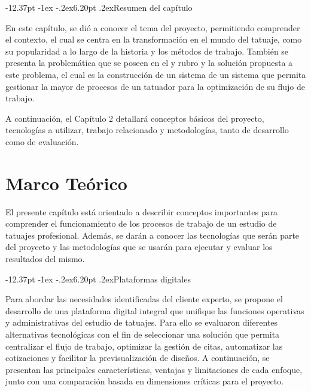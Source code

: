 \documentclass[12pt,letterpaper,oneside]{report}
\makeatletter
\renewcommand\section{\@startsection{section}{1}{\z@}%
  {-12.37pt \@plus -1ex \@minus -.2ex}{6.20pt \@plus.2ex}{\normalfont\large\bfseries}}
\makeatother
\begin{document}
\section{Resumen del capítulo}

En este capítulo, se dió a conocer el tema del proyecto, permitiendo comprender el contexto, el cual se centra en la transformación en el mundo del tatuaje, como su popularidad a lo largo de la historia y los métodos de trabajo. También se presenta la problemática que se poseen en el y rubro y la solución propuesta a este problema, el cual es la construcción de un sistema de un sistema que permita gestionar la mayor de procesos de un tatuador para la optimización de su flujo de trabajo.

A continuación, el Capítulo 2 detallará conceptos básicos del proyecto, tecnologías a utilizar, trabajo relacionado y metodologías, tanto de desarrollo como de evaluación.
\chapter{Marco Teórico}

El presente capítulo está orientado a describir conceptos importantes para comprender el funcionamiento de los procesos de trabajo de un estudio de tatuajes profesional. Además, se darán a conocer las tecnologías que serán parte del proyecto y las metodologías que se usarán para ejecutar y evaluar los resultados del mismo.

\section{Plataformas digitales}

Para abordar las necesidades identificadas del cliente experto, se propone el desarrollo de una plataforma digital integral que unifique las funciones operativas y administrativas del estudio de tatuajes. Para ello se evaluaron diferentes alternativas tecnológicas con el fin de seleccionar una solución que permita centralizar el flujo de trabajo, optimizar la gestión de citas, automatizar las cotizaciones y facilitar la previsualización de diseños. A continuación, se presentan las principales características, ventajas y limitaciones de cada enfoque, junto con una comparación basada en dimensiones críticas para el proyecto.

\vspace{\parskip}
\end{document}
